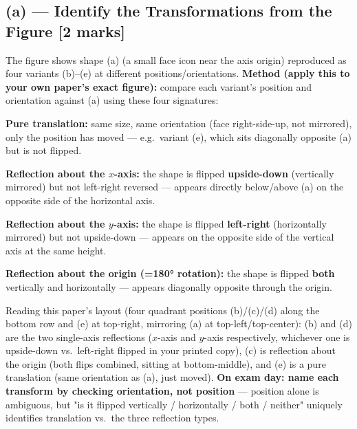 \documentclass[12pt, a4paper]{article}
\newenvironment{answerbox}{\begin{mdframed}[style=answerframe]}{\end{mdframed}}
\begin{document}
\subsection*{(a) --- Identify the Transformations from the Figure [2 marks]}
\begin{answerbox}
The figure shows shape (a) (a small face icon near the axis origin) reproduced as four variants (b)--(e) at different positions/orientations. \textbf{Method (apply this to your own paper's exact figure):} compare each variant's position and orientation against (a) using these four signatures:
\begin{keypoints}
  \item \textbf{Pure translation:} same size, same orientation (face right-side-up, not mirrored), only the position has moved --- e.g.\ variant (e), which sits diagonally opposite (a) but is not flipped.
  \item \textbf{Reflection about the $x$-axis:} the shape is flipped \textbf{upside-down} (vertically mirrored) but not left-right reversed --- appears directly below/above (a) on the opposite side of the horizontal axis.
  \item \textbf{Reflection about the $y$-axis:} the shape is flipped \textbf{left-right} (horizontally mirrored) but not upside-down --- appears on the opposite side of the vertical axis at the same height.
  \item \textbf{Reflection about the origin (=180° rotation):} the shape is flipped \textbf{both} vertically and horizontally --- appears diagonally opposite through the origin.
\end{keypoints}
Reading this paper's layout (four quadrant positions (b)/(c)/(d) along the bottom row and (e) at top-right, mirroring (a) at top-left/top-center): (b) and (d) are the two single-axis reflections ($x$-axis and $y$-axis respectively, whichever one is upside-down vs.\ left-right flipped in your printed copy), (c) is reflection about the origin (both flips combined, sitting at bottom-middle), and (e) is a pure translation (same orientation as (a), just moved). \textbf{On exam day: name each transform by checking orientation, not position} --- position alone is ambiguous, but "is it flipped vertically / horizontally / both / neither" uniquely identifies translation vs.\ the three reflection types.
\end{answerbox}
\end{document}
